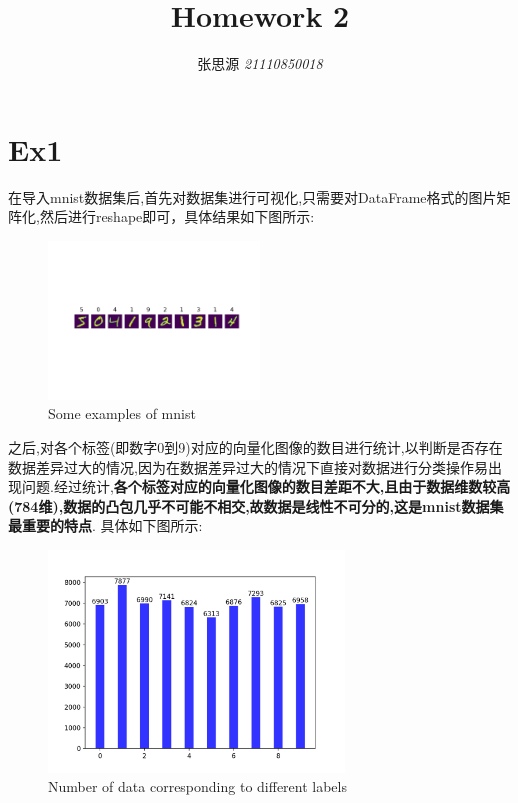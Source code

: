 \documentclass[UTF8,a4paper,11pt]{ctexart}
\title{\textbf{Homework 2}}
\author{ 张思源  \qquad  \textit{21110850018} }   %
\begin{document}
\maketitle
\section{Ex1}
\par 在导入mnist数据集后,首先对数据集进行可视化,只需要对DataFrame格式的图片矩阵化,然后进行reshape即可，具体结果如下图所示:
\begin{figure}[H]
	\centering
	\includegraphics[width=0.5\textwidth,height=0.5\textwidth]{show.png}
	\caption{Some examples of mnist}
\end{figure}
\par 之后,对各个标签(即数字0到9)对应的向量化图像的数目进行统计,以判断是否存在数据差异过大的情况,因为在数据差异过大的情况下直接对数据进行分类操作易出现问题.经过统计,\textbf{各个标签对应的向量化图像的数目差距不大,且由于数据维数较高(784维),数据的凸包几乎不可能不相交,故数据是线性不可分的,这是mnist数据集最重要的特点}.
具体如下图所示:
\begin{figure}[H]
	\centering
	\includegraphics[width=0.7\textwidth,height=0.5\textwidth]{figure.png}
	\caption{Number of data corresponding to different labels}
\end{figure}
\end{document}
